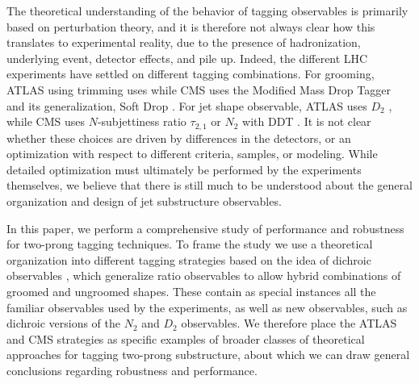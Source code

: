 \documentclass[11pt,letterpaper]{article}
\begin{document}
The
theoretical understanding of the behavior of tagging observables is primarily based on perturbation theory, and it is therefore
not always clear how this translates to experimental reality, due to
the presence of hadronization, underlying event, detector effects, and
pile up.
%
Indeed, the different LHC experiments have settled on different
tagging combinations.
%
For grooming, ATLAS using trimming \cite{Krohn:2009th} uses while CMS uses the Modified
  Mass Drop Tagger~\cite{Dasgupta:2013ihk} and its generalization, Soft Drop \cite{Larkoski:2014wba}.
  For jet shape observable, ATLAS uses $D_2$ \cite{Larkoski:2014gra,Larkoski:2015kga}, while CMS uses $N$-subjettiness ratio $\tau_{2,1}$ \cite{Thaler:2010tr,Thaler:2011gf} or $N_2$ \cite{Moult:2016cvt} with DDT \cite{Dolen:2016kst}.
  It is not clear whether these choices are driven by differences in the detectors, or an optimization with respect to different criteria, samples, or modeling. While detailed optimization must ultimately be performed by the experiments themselves, we believe that there is still much to be understood about the general organization and design of jet substructure observables.

In this paper, we perform a comprehensive study of performance and robustness for two-prong tagging techniques.
%
To frame the study we use a theoretical organization into different tagging strategies based on the idea of dichroic observables \cite{Salam:2016yht}, which generalize ratio observables to allow hybrid combinations of groomed and ungroomed shapes.
 These contain as special instances all the familiar observables used by the experiments, as well as new observables, such as dichroic versions of the $N_2$ and $D_2$ observables.
 We therefore place the ATLAS and CMS strategies as specific examples of broader classes of theoretical approaches for tagging two-prong substructure, about which we can draw general conclusions regarding robustness and performance.
\end{document}
